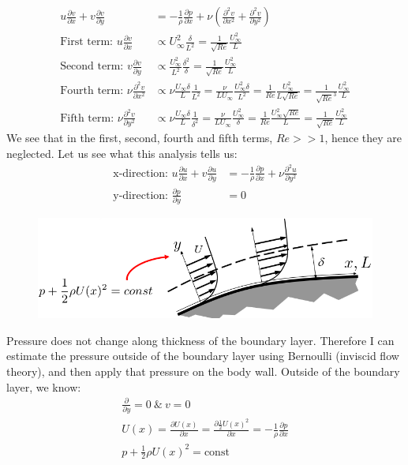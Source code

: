 \documentclass[class=report, crop=false, 12pt,a4paper]{standalone}
\begin{document}
\begin{align}
  u \frac{\partial v}{\partial x} + v\frac{\partial v}{\partial y} &= -\frac{1}{\rho}\frac{\partial p}{\partial x} + \nu \left(\frac{\partial^2 v}{\partial x^2} + \frac{\partial^2 v}{\partial y^2}\right)\\
  \textrm{First term: } u \frac{\partial v}{\partial x} &\propto U_\infty^2\frac{\delta}{L^2} = \frac{1}{\sqrt{Re}}\frac{U_\infty^2}{L}\\
  \textrm{Second term: } v\frac{\partial v}{\partial y} &\propto \frac{U_\infty^2}{L^2} \frac{\delta^2}{\delta} = \frac{1}{\sqrt{Re}} \frac{U_\infty^2}{L}\\
  \textrm{Fourth term: } \nu \frac{\partial^2 v}{\partial x^2} &\propto \nu \frac{U_\infty \delta}{L} \frac{1}{L^2} = \frac{\nu}{L U_\infty} \frac{U_\infty^2 \delta}{L^2} = \frac{1}{Re} \frac{U_\infty^2}{L\sqrt{Re}} = \frac{1}{\sqrt{Re}^3} \frac{U_\infty^2}{L}\\
  \textrm{Fifth term: } \nu \frac{\partial^2 v}{\partial y^2} &\propto \nu \frac{U_\infty \delta}{L} \frac{1}{\delta^2} = \frac{\nu}{LU_\infty} \frac{U_\infty^2}{\delta} = \frac{1}{Re} \frac{U_\infty^2 \sqrt{Re}}{L} = \frac{1}{\sqrt{Re}} \frac{U_\infty^2}{L}
\end{align}
We see that in the first, second, fourth and fifth terms, $Re >> 1$, hence they are neglected. Let us see what this analysis tells us:
\begin{align}
  \textrm{x-direction: } u\frac{\partial u}{\partial x} + v \frac{\partial u }{\partial y} &= - \frac{1}{\rho} \frac{\partial p}{\partial x} + \nu \frac{\partial^2 u}{\partial y^2}\\
  \textrm{y-direction: } \frac{\partial p}{\partial y} &= 0
\end{align}
\begin{figure}[H]
  \centering
  \includegraphics[width = 0.8 \textwidth]{../img/diagram51.png}
\end{figure}
Pressure does not change along thickness of the boundary layer. Therefore I can estimate the pressure outside of the boundary layer using Bernoulli (inviscid flow theory), and then apply that pressure on the body wall. Outside of the boundary layer, we know:
\begin{gather}
  \frac{\partial}{\partial y} = 0 \ \& \ v = 0\\
  U(x) = \frac{\partial U(x)}{\partial x} = \frac{\partial \frac{1}{2}U(x)^2}{\partial x} = -\frac{1}{\rho} \frac{\partial p}{\partial x}\\
  p + \frac{1}{2} \rho U(x)^2 = \textrm{const}
\end{gather}
\end{document}
